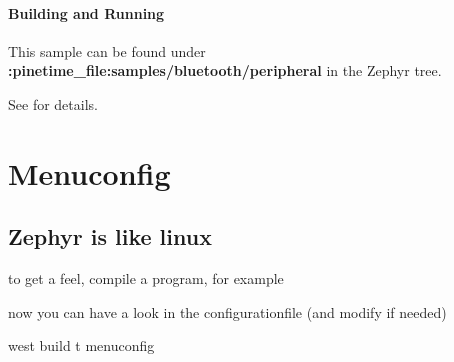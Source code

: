 \documentclass[letterpaper,10pt,english]{sphinxmanual}
\begin{document}
\subsubsection{Building and Running}
\label{\detokenize{samples/bluetooth/peripheral/README:building-and-running}}
This sample can be found under {\color{red}\bfseries{}:pinetime\_file:\textasciigrave{}samples/bluetooth/peripheral\textasciigrave{}} in the
Zephyr tree.

See {\hyperref[\detokenize{samples/bluetooth/bluetooth:bluetooth-samples}]{}} for details.


\chapter{Menuconfig}
\label{\detokenize{menuconfig:menuconfig}}\label{\detokenize{menuconfig::doc}}

\section{Zephyr is like linux}
\label{\detokenize{menuconfig:zephyr-is-like-linux}}

  to get a feel, compile a program, for example

\begin{sphinxVerbatim}[commandchars=\\\{\}]
\end{sphinxVerbatim}

now you can have a look in the configurationfile (and modify if needed)

\begin{sphinxVerbatim}[commandchars=\\\{\}]
 west build \PYGZhy{}t menuconfig
\end{sphinxVerbatim}
\end{document}
